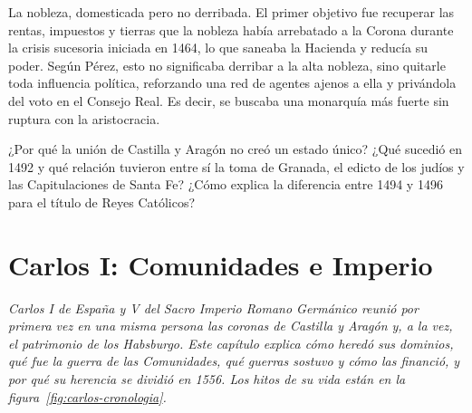 \documentclass{book}
\begin{document}
\begin{tcolorbox}[title={Autoficha}, studiumcheck, breakable]

La nobleza, domesticada pero no derribada. El primer objetivo fue recuperar las rentas, impuestos y tierras que la nobleza había arrebatado a la Corona durante la crisis sucesoria iniciada en 1464, lo que saneaba la Hacienda y reducía su poder. Según Pérez, esto no significaba derribar a la alta nobleza, sino quitarle toda influencia política, reforzando una red de agentes ajenos a ella y privándola del voto en el Consejo Real. Es decir, se buscaba una monarquía más fuerte sin ruptura con la aristocracia.


¿Por qué la unión de Castilla y Aragón no creó un estado único? ¿Qué sucedió en 1492 y qué relación tuvieron entre sí la toma de Granada, el edicto de los judíos y las Capitulaciones de Santa Fe? ¿Cómo explica la diferencia entre 1494 y 1496 para el título de Reyes Católicos?

\end{tcolorbox}

\chapter{Carlos I: Comunidades e Imperio}
\label{chap:hist-02}

\noindent\textit{Carlos I de España y V del Sacro Imperio Romano Germánico reunió por primera vez en una misma persona las coronas de Castilla y Aragón y, a la vez, el patrimonio de los Habsburgo. Este capítulo explica cómo heredó sus dominios, qué fue la guerra de las Comunidades, qué guerras sostuvo y cómo las financió, y por qué su herencia se dividió en 1556. Los hitos de su vida están en la figura~\ref{fig:carlos-cronologia}.}

\end{document}

